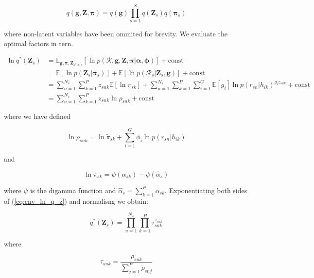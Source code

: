 \documentclass{article}
\begin{document}
\begin{equation}
\label{eq:cnv_vb_factors}
    q(\boldsymbol{g}, \boldsymbol{Z}, \boldsymbol{\pi}) = q(\boldsymbol{g}) \prod_{s = 1}^S q(\boldsymbol{Z}_s) q(\boldsymbol{\pi}_s)
\end{equation}

where non-latent variables have been ommited for brevity. We evaluate the optimal factors in tern.

\begin{align}
\label{eq:cnv_ln_q_z}
\ln q^*(\boldsymbol{Z}_s) &= \mathbb{E}_{\boldsymbol{g}, \boldsymbol{\pi}, \boldsymbol{Z}_{s' \ne s}} [\ln p(\mathcal{R}, \boldsymbol{g}, \boldsymbol{Z}, \boldsymbol{\pi} | \boldsymbol{\alpha}, \boldsymbol{\phi})] + \text{const} \\
&= \mathbb{E}[\ln p(\boldsymbol{Z}_s | \boldsymbol{\pi}_s)] + \mathbb{E}[\ln p(\mathcal{R}_s | \boldsymbol{Z}_s, \boldsymbol{g})] + \text{const} \\
&= \sum_{n = 1}^{N_s} \sum_{k = 1}^P z_{snk} \mathbb{E}[\ln \pi_{sk}] + \sum_{n = 1}^{N_s} \sum_{k = 1}^P \sum_{i = 1}^G \mathbb{E}[g_i] \ln p(r_{sn} | h_{ik})^{g_i z_{snk}} + \text{const} \\
&= \sum_{n = 1}^{N_s} \sum_{k = 1}^P z_{snk} \ln \rho_{snk} + \text{const}
\end{align}

where we have defined

\begin{equation}
\label{eq:cnv_ln_rho}
\ln \rho_{snk} = \ln \tilde{\pi}_{sk} + \sum_{i = 1}^G \phi_i \ln p(r_{sn} | h_{ik})
\end{equation}

and

\begin{equation}
\label{eq:cnv_ex_ln_pi}
\ln \tilde{\pi}_{sk} = \psi(\alpha_{sk}) - \psi(\hat{\alpha}_s)
\end{equation}

where $\psi$ is the digamma function and $\hat{\alpha}_{s} = \sum_{k = 1}^P \alpha_{sk}$. Exponentiating both sides of (\ref{eq:cnv_ln_q_z}) and normalisng we obtain:

\begin{equation}
\label{eq:cnv_q_z}
q^*(\boldsymbol{Z}_s) = \prod_{n = 1}^{N_s} \prod_{k = 1}^P \tau_{snk}^{z_{snk}}
\end{equation}

where

\begin{equation}
\label{eq:cnv_tau}
\tau_{snk} = \frac{\rho_{snk}}{\sum_{j = 1}^P \rho_{snj}}
\end{equation}
\end{document}
